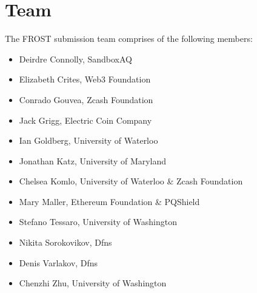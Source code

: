 \section{Team}

The FROST submission team comprises of the following members:

\begin{itemize}
\item Deirdre Connolly, SandboxAQ
\item Elizabeth Crites, Web3 Foundation
\item Conrado Gouvea, Zcash Foundation
\item Jack Grigg, Electric Coin Company
\item Ian Goldberg, University of Waterloo
\item Jonathan Katz, University of Maryland
\item Chelsea Komlo, University of Waterloo \& Zcash Foundation 
\item Mary Maller, Ethereum Foundation \& PQShield
\item Stefano Tessaro, University of Washington
\item Nikita Sorokovikov, Dfns
\item Denis Varlakov, Dfns
\item Chenzhi Zhu, University of Washington
\end{itemize}
